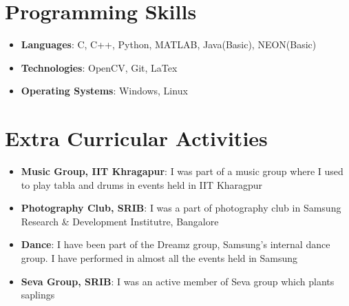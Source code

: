\documentclass[letterpaper,10pt]{article}
\newcommand{\resumeItem}[2]{
  \item\small{
    \textbf{#1}{: #2 \vspace{-2pt}}
  }
}
\newcommand{\resumeSubItem}[2]{\resumeItem{#1}{#2}\vspace{2pt}}
\newcommand{\resumeSubHeadingListStart}{\begin{itemize}[leftmargin=*]}
\newcommand{\resumeSubHeadingListEnd}{\end{itemize}}
\begin{document}
%
\section{Programming Skills}
  \resumeSubHeadingListStart
    \resumeSubItem{Languages}{ C, C++,  Python, MATLAB, Java(Basic), NEON(Basic)}
     
      \resumeSubItem{Technologies}{ OpenCV, Git, LaTex}
    
      \resumeSubItem{Operating Systems}{ Windows, Linux}
    
  \resumeSubHeadingListEnd



\section{Extra Curricular Activities}
 \resumeSubHeadingListStart
\resumeSubItem{Music Group, IIT Khragapur}
      {I was part of a music group where I used to play tabla and drums in events held in IIT Kharagpur}
 \resumeSubItem{Photography Club, SRIB}
      {I was a part of photography club in Samsung Research \& Development Institutre, Bangalore}
    \resumeSubItem{Dance}
      {I have been part of the Dreamz group, Samsung's internal dance group. I have performed in almost all the events held in Samsung}
    \resumeSubItem{Seva Group, SRIB}
     {I was an active member of Seva group which plants saplings}
    
  \resumeSubHeadingListEnd
\end{document}
